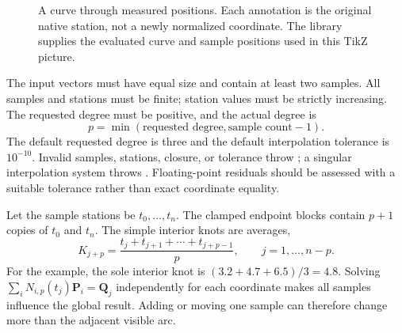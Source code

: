 \begin{figure}[tbp]
\centering
{}
\caption{A curve through measured positions. Each annotation is the original
native station, not a newly normalized coordinate. The library supplies the
evaluated curve and sample positions used in this TikZ picture.}
\label{fig:spline-interpolation}
\end{figure}

The input vectors must have equal size and contain at least two samples.
All samples and stations must be finite; station values must be strictly
increasing. The requested degree must be positive, and the actual degree is
\begin{equation}
 p=\min(\text{requested degree},\text{sample count}-1).
\end{equation}
The default requested degree is three and the default interpolation tolerance
is $10^{-10}$. Invalid samples, stations, closure, or tolerance throw
; a singular interpolation system throws
. Floating-point residuals should be assessed with a
suitable tolerance rather than exact coordinate equality.

Let the sample stations be $t_0,\ldots,t_n$. The clamped endpoint blocks contain
$p+1$ copies of $t_0$ and $t_n$. The simple interior knots are averages,
\begin{equation}
 K_{j+p}=\frac{t_j+t_{j+1}+\cdots+t_{j+p-1}}{p},
 \qquad j=1,\ldots,n-p.
\end{equation}
For the example, the sole interior knot is
$(3.2+4.7+6.5)/3=4.8$. Solving
$\sum_i N_{i,p}(t_j)\mathbf P_i=\mathbf Q_j$ independently for each coordinate
makes all samples influence the global result. Adding or moving one sample
can therefore change more than the adjacent visible arc.

